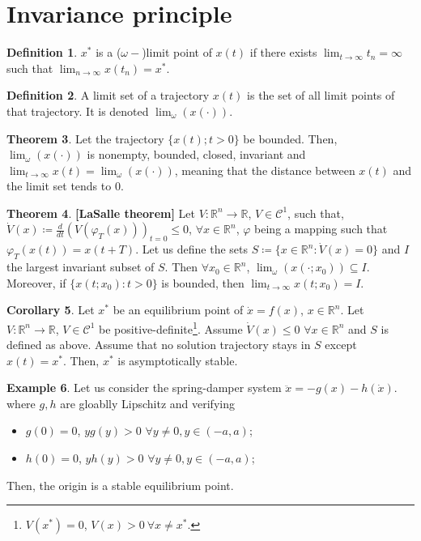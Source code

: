 \documentclass[12pt, openany]{report}
\theoremstyle{definition}
\newtheorem{thm}{Theorem}[chapter]
\newtheorem{definition}[thm]{Definition}
\newtheorem{exmp}[thm]{Example}
\newtheorem{crl}[thm]{Corollary}
\newcommand{\R}{\mathbb{R}}
\begin{document}
\section{Invariance principle}
\begin{definition}
    \(x^*\) is a (\(\omega-\))limit point of \(x(t)\) if there exists \(\lim_{t\rightarrow \infty}t_n = \infty\) such that \(\lim_{n\rightarrow \infty}x(t_n)=x^*\).
\end{definition}
\begin{definition}
    A limit set of a trajectory \(x(t)\) is the set of all limit points of that trajectory. It is denoted \(\lim_{\omega}(x(\cdot))\).
\end{definition}
\begin{thm}
    Let the trajectory \(\{x(t);t>0\}\) be bounded. Then, \(\lim_\omega(x(\cdot))\) is nonempty, bounded, closed, invariant and \(\lim_{t\rightarrow \infty}x(t)=\lim_\omega (x(\cdot))\), meaning that the distance between \(x(t)\) and the limit set tends to 0.
\end{thm}
\begin{thm}\textbf{[LaSalle theorem]}
    Let \(V:\R^n\rightarrow \R\), \(V\in \mathcal{C}^1\), such that, \(\dot V(x)\coloneqq \frac{d}{dt}\left(V(\varphi_T(x))\right)_{t=0}\le 0\), \(\forall x\in \R^n\), \(\varphi\) being a mapping such that \(\varphi_T(x(t)) = x(t+T)\). Let us define the sets \(S\coloneqq \{x\in \R^n :\dot V(x)=0\}\) and \(I\) the largest invariant subset of \(S\). Then \(\forall x_0\in \R^n\), \(\lim_\omega (x(\cdot;x_0)) \subseteq I\). Moreover, if \(\{x(t;x_0):t>0\}\) is bounded, then \(\lim_{t\rightarrow \infty}x(t;x_0)=I\). 
\end{thm}
\begin{crl}
    Let \(x^*\) be an equilibrium point of \(\dot x=f(x)\), \(x\in \R^n\). Let \(V:\R^n\rightarrow \R\), \(V\in \mathcal{C}^1\) be positive-definite\footnote{\(V(x^*)=0\), \(V(x)>0\: \forall x\neq x^*\).}. Assume \(\dot V(x)\le 0\) \(\forall x\in \R^n\) and \(S\) is defined as above. Assume that no solution trajectory stays in \(S\) except \(x(t)=x^*\). Then, \(x^*\) is asymptotically stable. 
\end{crl}
\begin{exmp}
    Let us consider the spring-damper system \(\ddot x=-g(x)-h(\dot x)\). where \(g,h\) are gloablly Lipschitz and verifying
    \begin{itemize}
        \item \(g(0)=0\), \(yg(y)>0\) \(\forall y\neq 0, y\in (-a,a)\);
        \item \(h(0)=0\), \(yh(y)>0\) \(\forall y\neq 0, y\in (-a,a)\);
    \end{itemize}
    Then, the origin is a stable equilibrium point. 
\end{exmp}
\end{document}

